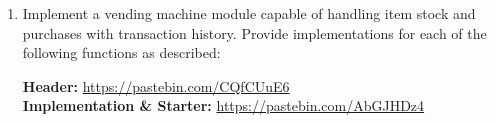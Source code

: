 \documentclass{article}
\begin{document}
\begin{enumerate}
    \newpage
    \item Implement a vending machine module capable of handling item stock and purchases with transaction history. Provide implementations for each of the following functions as described:


    \textbf{Header:}
    \url{https://pastebin.com/CQfCUuE6} \\
    \textbf{Implementation \& Starter:}
    \url{https://pastebin.com/AbGJHDz4}
    
\end{enumerate}
\end{document}

